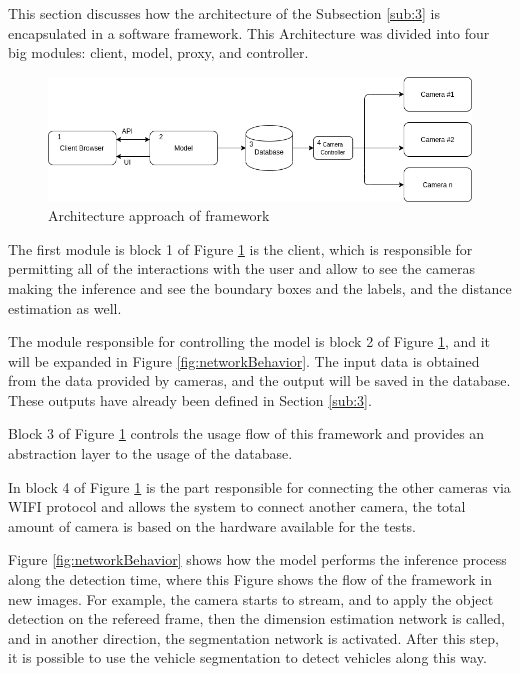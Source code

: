 This section discusses how the architecture of the Subsection \ref{sub:3} is encapsulated in a software framework. This Architecture was divided into four big modules: client, model, proxy, and controller. 



\begin{figure}[H]
\centering
\includegraphics[scale=0.6]{imagens/diagram.png}
\caption{Architecture approach of framework}
\label{fig:framework}
\end{figure}

The first module is block 1 of Figure \ref{fig:framework} is the client, which is responsible for permitting all of the interactions with the user and allow to see the cameras making the inference and see the boundary boxes and the labels, and the distance estimation as well.

The module responsible for controlling the model is block 2 of Figure \ref{fig:framework}, and it will be expanded in Figure \ref{fig:networkBehavior}. The input data is obtained from the data provided by cameras, and the output will be saved in the database. These outputs have already been defined in Section \ref{sub:3}. 

Block 3 of Figure \ref{fig:framework} controls the usage flow of this framework and provides an abstraction layer to the usage of the database. 

In block 4 of Figure \ref{fig:framework} is the part responsible for connecting the other cameras via WIFI protocol and allows the system to connect another camera, the total amount of camera is based on the hardware available for the tests. 


Figure \ref{fig:networkBehavior} shows how the model performs the inference process along the detection time, where this Figure shows the flow of the framework in new images. For example, the camera starts to stream, and to apply the object detection on the refereed frame, then the dimension estimation network is called, and in another direction, the segmentation network is activated. After this step, it is possible to use the vehicle segmentation to detect vehicles along this way.






